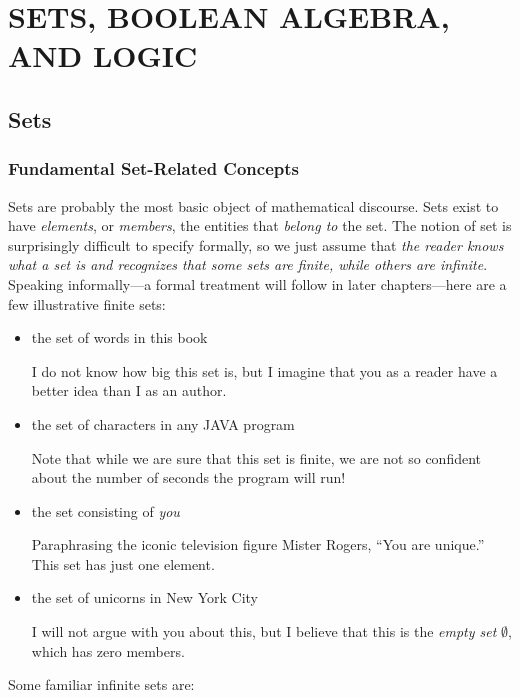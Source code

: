 
\chapter{SETS, BOOLEAN ALGEBRA, AND LOGIC}
\label{ch:sets-BA-logic}

\section{Sets}
\label{sec:sets}

\subsection{Fundamental Set-Related Concepts}
\label{sec:set-concepts}

Sets are probably the most basic object of mathematical
discourse.  Sets exist to have {\it elements}, or
{\it members}, the entities that {\em belong
  to} the set.  The notion of set is
surprisingly difficult to specify formally, so we just assume that
{\em the reader knows what a set is and recognizes that some sets are
  finite, while others are infinite}.  Speaking informally---a formal
treatment will follow in later chapters---here are a few illustrative
finite sets:
\begin{itemize}
\item
the set of words in this book

I do not know how big this set is, but I imagine that you as a reader
have a better idea than I as an author.
\item
the set of characters in any JAVA program

Note that while we are sure that this set is finite, we are not so
confident about the number of seconds the program will run!
\item
the set consisting of {\em you}

Paraphrasing the iconic television figure Mister Rogers, ``You are
unique.''  This set has just one element.

\item
the set of unicorns in New York City

I will not argue with you about this, but I believe that this is the
{\em empty set} $\emptyset$, which has zero members. 
\end{itemize}
Some familiar infinite sets are:
